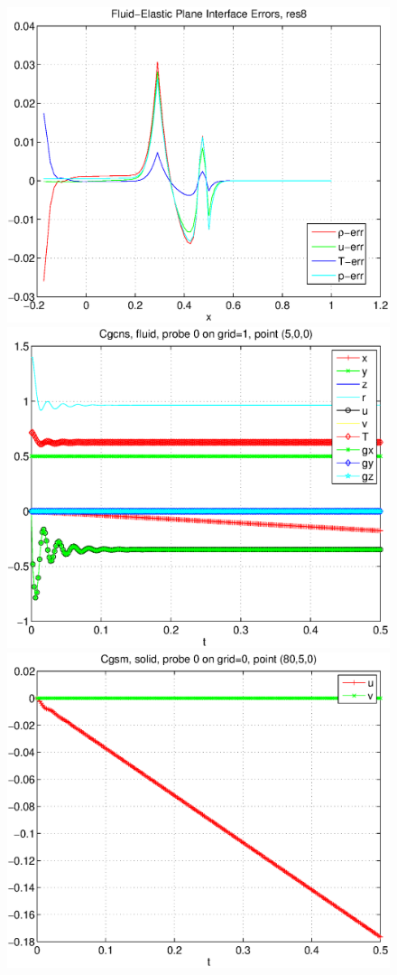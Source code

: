 {\begin{figure}[h]
\includegraphics[width=\fwidth]{fluidElastic_planeInterfaceErr_res8.eps}
\includegraphics[width=\fwidth]{planeInterfaceProbe8Fluid1.eps}
\includegraphics[width=\fwidth]{planeInterfaceProbe8Solid1.eps}

\end{figure}}
